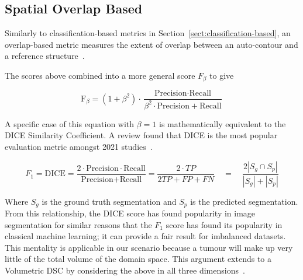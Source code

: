 \documentclass[12pt,twoside]{report}
\begin{document}
\subsection{Spatial Overlap Based}\label{sect:spatial-overlap-based}

Similarly to classification-based metrics in Section~\ref{sect:classification-based}, an overlap-based metric measures the extent of overlap between an auto-contour and a reference structure~\cite{review-metrics}.

The scores above combined into a more general score $F_\beta$ to give

\begin{equation*}
 \text{F}_\beta = (1+\beta^2)\cdot \frac{\text{Precision} \cdot \text{Recall}}{\beta^2 \cdot \text{Precision}+\text{Recall}}
\end{equation*}

A specific case of this equation with $\beta=1$ is mathematically equivalent to the DICE Similarity Coefficient. A review found that DICE is the most popular evaluation metric amongst 2021 studies~\cite{review-metrics,evaluation-metrics, Sherer2021-le}.


\begin{equation*}
 F_1 = \text{DICE} = \frac{2 \cdot \text{Precision} \cdot \text{Recall}} {\text{Precision} + \text{Recall}} = \frac{2 \cdot TP}{2TP + FP + FN} \quad = \quad \frac{2|S_g\cap S_p|}{|S_g|+|S_p|}
\end{equation*}

Where $S_g$ is the ground truth segmentation and $S_p$ is the predicted segmentation. From this relationship, the DICE score has found popularity in image segmentation for similar reasons that the $F_1$ score has found its popularity in classical machine learning; it can provide a fair result for imbalanced datasets. This mentality is applicable in our scenario because a tumour will make up very little of the total volume of the domain space. This argument extends to a Volumetric DSC by considering the above in all three dimensions~\cite{APL}.
\end{document}
